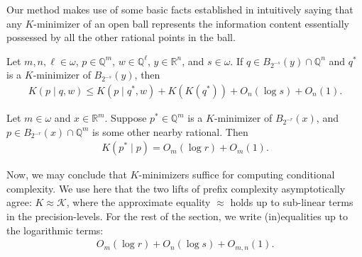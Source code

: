 Our method makes use of some basic facts established in \cite{CL14} intuitively saying that any $K$-minimizer of an open ball represents the information content essentially possessed by all the other rational points in the ball. 

\begin{lemma}
    \label{K_minimizers_know_least}
    Let $m, n, \ell \in \omega$, $p \in \mathbb{Q}^m$, $w \in \mathbb{Q}^\ell$, $y \in \mathbb{R}^n$, and $s \in \omega$. If $q \in B_{2^{-s}}(y) \cap \mathbb{Q}^n$ and $q^*$ is a $K$-minimizer of $B_{2^{-s}}(y)$, then
    \begin{align*}
        K(p \mid q, w) \leq K(p \mid q^*, w) + K(K(q^*)) + O_n(\log s) + O_n(1).
    \end{align*}
\end{lemma}

\begin{corollary}
    \label{corollary:K_minimizer_not_complex}
    Let $m \in \omega$ and $x \in \mathbb{R}^m$. Suppose $p^* \in \mathbb{Q}^m$ is a $K$-minimizer of $B_{2^{-r}}(x)$, and $p \in B_{2^{-r}}(x) \cap \mathbb{Q}^m$ is some other nearby rational. Then 
    \begin{align*}
        K(p^* \mid p) = O_m(\log r) + O_m(1).
    \end{align*}
\end{corollary}

Now, we may conclude that $K$-minimizers suffice for computing conditional complexity. We use here that the two lifts of prefix complexity asymptotically agree: $K \approx \mathcal{K}$, where the approximate equality $\approx$ holds up to sub-linear terms in the precision-levels. For the rest of the section, we write (in)equalities up to the logarithmic terms: 
\begin{align}
    O_m(\log r) + O_n(\log s) + O_{m, n}(1).
    \label{equation:logarithmic_factors}
\end{align}

